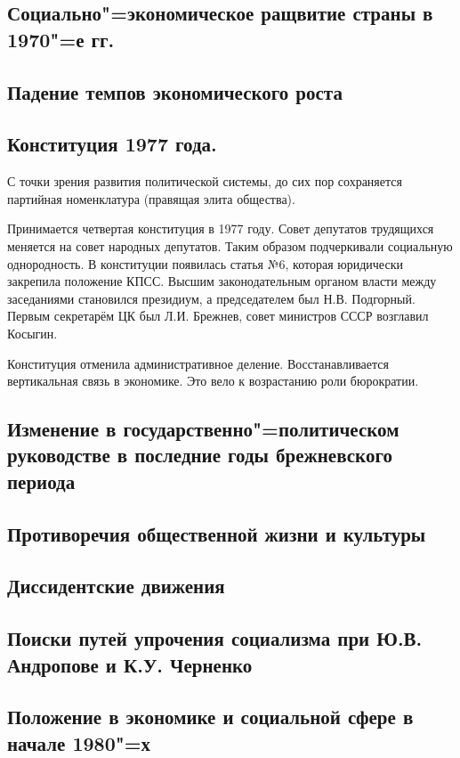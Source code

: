 \subsection{Социально"=экономическое ращвитие страны в 1970"=е гг.}

\subsection{Падение темпов экономического роста}

\subsection{Конституция 1977 года.}

С точки зрения развития политической системы, до сих пор сохраняется партийная номенклатура (правящая элита общества). 

Принимается четвертая конституция в 1977 году. Совет депутатов трудящихся меняется на совет народных депутатов. Таким образом подчеркивали социальную однородность. В конституции появилась статья №6, которая юридически закрепила положение КПСС. Высшим законодательным органом власти между заседаниями становился президиум, а председателем был Н.В. Подгорный. Первым секретарём ЦК был Л.И. Брежнев, совет министров СССР возглавил Косыгин.

Конституция отменила административное деление. Восстанавливается вертикальная связь в экономике. Это вело к возрастанию роли бюрократии. 

\subsection{Изменение в государственно"=политическом руководстве в последние годы брежневского периода}

\subsection{Противоречия общественной жизни и культуры}

\subsection{Диссидентские движения}

\subsection{Поиски путей упрочения социализма при Ю.В. Андропове и К.У. Черненко}

\subsection{Положение в экономике и социальной сфере в начале 1980"=х}


